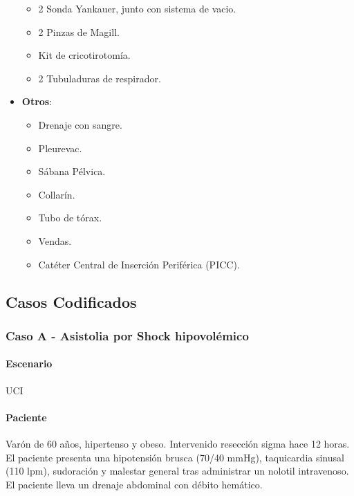 \begin{itemize}[topsep=0pt, partopsep=0pt,itemsep=0pt,parsep=0pt]
\begin{itemize}[topsep=0pt, partopsep=0pt,itemsep=0pt,parsep=0pt]
        \item 2 Sonda Yankauer, junto con sistema de vacio.
        \item 2 Pinzas de Magill.
        \item Kit de cricotirotomía.
        \item 2 Tubuladuras de respirador.
    \end{itemize}
    \item \textbf{Otros}:
    \begin{itemize}[topsep=0pt, partopsep=0pt,itemsep=0pt,parsep=0pt]
        \item Drenaje con sangre.
        \item Pleurevac.
        \item Sábana Pélvica.
        \item Collarín.
        \item Tubo de tórax.
        \item Vendas.
        \item Catéter Central de Inserción Periférica (PICC).
    \end{itemize}
\end{itemize}

\clearpage

\subsection{Casos Codificados}
\subsubsection{Caso A - Asistolia por Shock hipovolémico}
\paragraph{Escenario} UCI
\vspace{-12.5pt}
\paragraph{Paciente} Varón de 60 años, hipertenso y obeso. Intervenido resección sigma hace 12 horas. El paciente presenta una hipotensión brusca (70/40 mmHg), taquicardia sinusal (110 lpm), sudoración y malestar general tras administrar un nolotil intravenoso. El paciente lleva un drenaje abdominal con débito hemático.
\vspace{-12.5pt}
